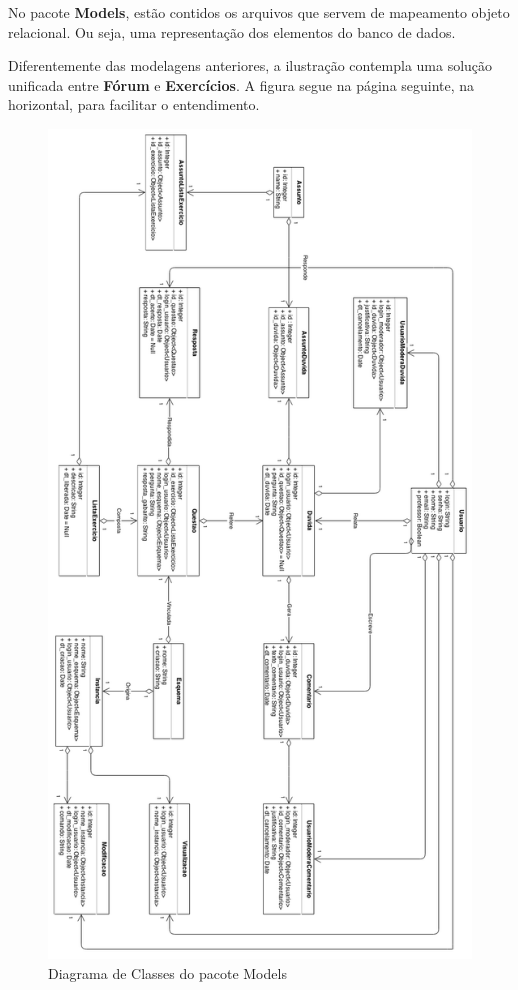 \documentclass[graduacao,brazil]{ThesisPUC}
\begin{document}
No pacote \textbf{Models}, est\~{a}o contidos os arquivos que servem de mapeamento objeto
relacional. Ou seja, uma representa\c{c}\~{a}o dos elementos do banco de dados.

Diferentemente das modelagens anteriores, a ilustra\c{c}\~{a}o contempla uma solu\c{c}\~{a}o
unificada entre \textbf{F\'{o}rum} e \textbf{Exerc\'{i}cios}. A figura segue na p\'{a}gina
seguinte, na horizontal, para facilitar o entendimento.

\begin{figure}[H]
    \centering
    \includegraphics[width=\linewidth]{Imagens/DiagramaDeClasseModels.png}
    \caption{Diagrama de Classes do pacote Models}
\end{figure}
\end{document}

